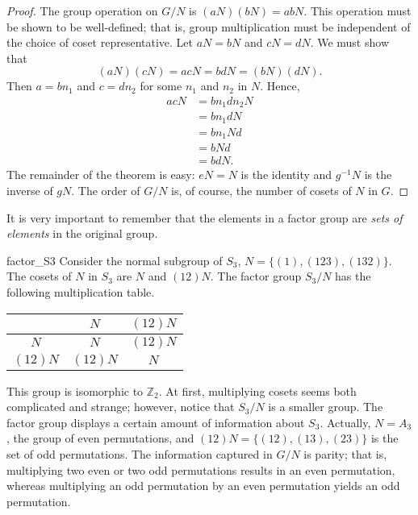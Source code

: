  
\begin{proof}
The group operation on $G/N$ is $(a N ) (b N)= a b N$.  This operation
must be shown to be well-defined; that is, group multiplication must
be independent of the choice of  coset representative. Let $aN = bN$
and $cN = dN$. We must show that
\[
(aN) (cN) = acN = bd N = (b N)(d N).
\]
Then $a = b n_1$ and $c = d n_2$ for some $n_1$ and $n_2$ in
$N$. Hence, 
\begin{align*}
acN & = b n_1 d n_2 N \\
& = b n_1 d N \\
& = b n_1 N d \\
& = b N d \\
& = b d N.
\end{align*}
The remainder of the theorem is easy: $eN = N$ is the identity and
$g^{-1} N$ is the inverse of $gN$. The order of $G/N$ is, of course,
the number of cosets of $N$ in $G$. 
\end{proof}
 
 
\medskip
 
 
It is very important to remember that the elements in a factor group are
{\em sets of elements\/} in the original group. 
 
 

 
 
\begin{example}{factor_S3}
Consider the normal subgroup of $S_3$, $N = \{ (1), (123), (132)  \}$.
The cosets of $N$ in $S_3$ are $N$ and $(12) N$. The factor group $S_3
/ N$ has the following multiplication table.
\begin{center}
\begin{tabular}{c|cc}
         & $N$      & $(12) N$ \\
\hline
$N$      & $N$      & $(12) N$ \\
$(12) N$ & $(12) N$ & $N$
\end{tabular}
\end{center}
This group is isomorphic to ${\mathbb Z}_2$. At first, multiplying cosets
seems both complicated and strange; however, notice that  $S_3 / N$ is
a smaller group. The factor group displays a certain amount of
information about $S_3$.  Actually, $N = A_3$, the group of even
permutations, and $(12) N = \{ (12), (13), (23) \}$ is the set of odd
permutations. The information captured in $G/N$ is parity; that is,
multiplying two even or two odd permutations results in an even
permutation, whereas multiplying an odd permutation by an even
permutation yields an odd permutation.
\end{example}
 
